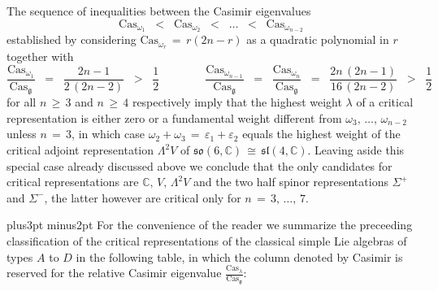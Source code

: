 \documentclass[12pt]{article}
\def\C{\mathbb{C}}
\def\Cas{\mathrm{Cas}}
\def\e{\varepsilon}
\def\g{\mathfrak{g}}
\def\L{\Lambda}
\def\pfill{\vskip6pt plus3pt minus2pt\noindent}
\def\sl{\mathfrak{sl}}
\def\so{\mathfrak{so}}
\def\Z{\Sigma}
\begin{document}
 The sequence of inequalities between the Casimir eigenvalues
 \begin{equation}\label{dnseq}
  \Cas_{\omega_1}
  \;\;<\;\;
  \Cas_{\omega_2}
  \;\;<\;\;
  \ldots
  \;\;<\;\;
  \Cas_{\omega_{n-2}}
 \end{equation}
 established by considering $\Cas_{\omega_r}\,=\,r(2n-r)$ as a quadratic
 polynomial in $r$ together with
 $$
  \frac{\Cas_{\omega_1}}{\Cas_\g}
  \;\;=\;\;
  \frac{2n-1}{2\,(2n-2)}
  \;\;>\;\;\frac12
  \qquad\qquad
  \frac{\Cas_{\omega_{n-1}}}{\Cas_\g}
  \;\;=\;\;
  \frac{\Cas_{\omega_n}}{\Cas_\g}
  \;\;=\;\;
  \frac{2n\,(2n-1)}{16\,(2n-2)}
  \;\;>\;\;\frac12
 $$
 for all $n\,\geq\,3$ and $n\,\geq\,4$ respectively imply that the highest
 weight $\lambda$ of a critical representation is either zero or a fundamental
 weight different from $\omega_3,\,\ldots,\,\omega_{n-2}$ unless $n\,=\,3$,
 in which case $\omega_2+\omega_3\,=\,\e_1+\e_2$ equals the highest weight
 of the critical adjoint representation $\L^2V$ of $\so(6,\C)\,\cong\,
 \sl(4,\C)$. Leaving aside this special case already discussed above we
 conclude that the only candidates for critical representations are
 $\C,\,V,\,\L^2V$ and the two half spinor representations $\Z^+$ and
 $\Z^-$, the latter however are critical only for $n\,=\,3,\,\ldots,\,7$.

 \pfill
 For the convenience of the reader we summarize the preceeding classification
 of the critical representations of the classical simple Lie algebras of types
 $A$ to $D$ in the following table, in which the column denoted by Casimir is
 reserved for the relative Casimir eigenvalue $\frac{\Cas_\lambda}{\Cas_\g}$:
\end{document}
